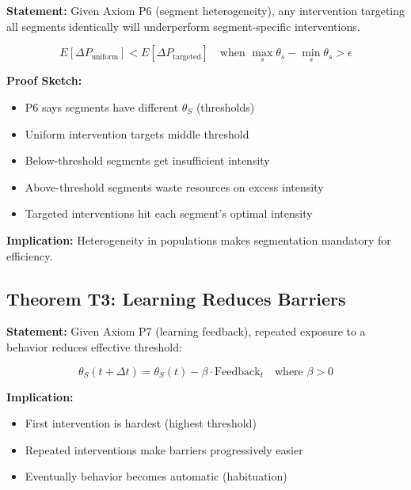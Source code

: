 \documentclass[11pt, a4paper]{article}
\begin{document}
\textbf{Statement:} Given Axiom P6 (segment heterogeneity), any intervention targeting all segments identically will underperform segment-specific interventions.

\begin{equation}
E[\Delta P_{\text{uniform}}] < E[\Delta P_{\text{targeted}}]
\quad \text{when } \max_s \theta_s - \min_s \theta_s > \epsilon
\end{equation}

\textbf{Proof Sketch:}
\begin{itemize}[nosep]
    \item P6 says segments have different $\theta_S$ (thresholds)
    \item Uniform intervention targets middle threshold
    \item Below-threshold segments get insufficient intensity
    \item Above-threshold segments waste resources on excess intensity
    \item Targeted interventions hit each segment's optimal intensity
\end{itemize}

\textbf{Implication:} Heterogeneity in populations makes segmentation mandatory for efficiency.

\subsection{Theorem T3: Learning Reduces Barriers}

\textbf{Statement:} Given Axiom P7 (learning feedback), repeated exposure to a behavior reduces effective threshold:

\begin{equation}
\theta_S(t+\Delta t) = \theta_S(t) - \beta \cdot \text{Feedback}_t \quad \text{where } \beta > 0
\end{equation}

\textbf{Implication:}
\begin{itemize}[nosep]
    \item First intervention is hardest (highest threshold)
    \item Repeated interventions make barriers progressively easier
    \item Eventually behavior becomes automatic (habituation)
\end{itemize}

\end{document}
